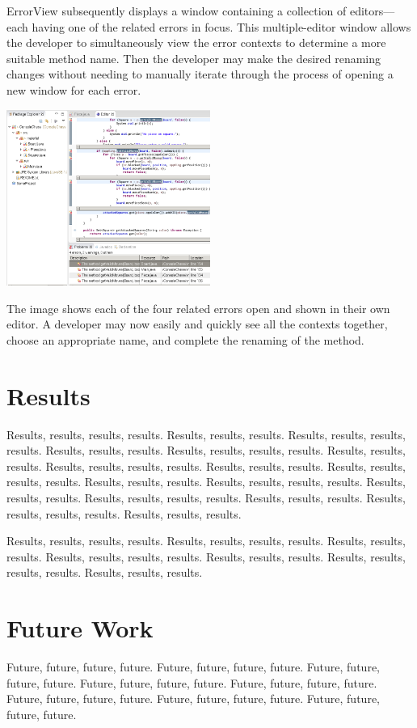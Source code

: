 \documentclass{sigplanconf}
\begin{document}
ErrorView subsequently displays a window containing a collection of
editors---each having
one of the related errors in focus. This multiple-editor window allows the
developer to simultaneously view the error
contexts to determine a more suitable method name. Then the developer may make
the desired renaming changes without needing to manually iterate through the
process of opening a new window for each error.
\begin{center}
\includegraphics[width=0.50\textwidth]{multiple-editors.png}
\end{center}

The image shows each of the four related errors open and shown in their own
editor. A developer may now easily and quickly see all the contexts together,
choose an appropriate name, and complete the renaming of the method.

\section{Results}
Results, results, results, results. Results, results, results.
Results, results, results, results. Results, results, results.
Results, results, results, results. Results, results, results.
Results, results, results, results. Results, results, results.
Results, results, results, results. Results, results, results.
Results, results, results, results. Results, results, results.
Results, results, results, results. Results, results, results.
Results, results, results, results. Results, results, results.

Results, results, results, results. 
Results, results, results, results. Results, results, results.
Results, results, results, results. Results, results, results.
Results, results, results, results. Results, results, results.
\section{Future Work}
Future, future, future, future. Future, future, future, future.
Future, future, future, future. Future, future, future, future.
Future, future, future, future. Future, future, future, future.
Future, future, future, future. Future, future, future, future.
\end{document}
